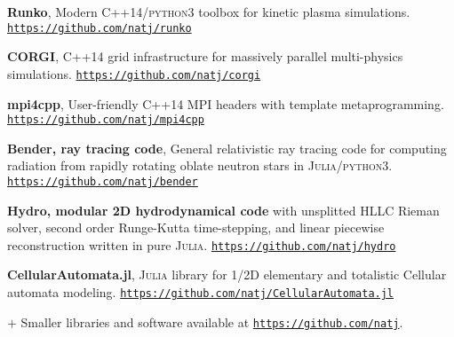 \documentclass[10pt]{article}
\begin{document}
\vspace{-20pt}
\begin{thebibliography}{6}
\vspace{-5pt}
    \textbf{Runko}, 
\newblock Modern \textsc{C++}14/\textsc{python3} toolbox for kinetic plasma simulations. 
 \newblock \mbox{\href{https://github.com/natj/Runko}{\nolinkurl{https://github.com/natj/runko}}}

    \textbf{CORGI}, 
 \newblock \textsc{C++}14 grid infrastructure for massively parallel multi-physics simulations. 
 \newblock \mbox{\href{https://github.com/natj/corgi}{\nolinkurl{https://github.com/natj/corgi}}} 

    \textbf{mpi4cpp}, 
\newblock User-friendly \textsc{C++}14 MPI headers with template metaprogramming. 
 \newblock \mbox{\href{https://github.com/natj/mpi4cpp}{\nolinkurl{https://github.com/natj/mpi4cpp}}}

    \textbf{Bender, ray tracing code}, 
        \newblock General relativistic ray tracing code for computing radiation from rapidly rotating oblate neutron stars in \textsc{Julia}/\textsc{python3}. 
 \newblock \mbox{\href{https://github.com/natj/bender}{\nolinkurl{https://github.com/natj/bender}}}

    \textbf{Hydro, modular 2D hydrodynamical code} 
\newblock with unsplitted HLLC Rieman solver, second order Runge-Kutta time-stepping, and linear piecewise reconstruction written in pure \textsc{Julia}.
 \newblock \mbox{\href{https://github.com/natj/hydro}{\nolinkurl{https://github.com/natj/hydro}}}

    \textbf{CellularAutomata.jl}, 
\newblock \textsc{Julia} library for 1/2D elementary and totalistic Cellular automata modeling. 
\newblock \mbox{\href{https://github.com/natj/CellularAutomata.jl}{\nolinkurl{https://github.com/natj/CellularAutomata.jl}}}
\end{thebibliography}

\noindent
$+$ Smaller libraries and software available at \mbox{\href{https://github.com/natj}{\nolinkurl{https://github.com/natj}}}.
\end{document}
